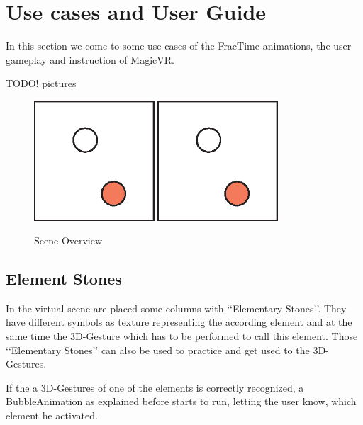 \section{Use cases and User Guide}
In this section we come to some use cases of the FracTime animations, the user gameplay and instruction of MagicVR.

TODO! pictures\\
\begin{figure}[!ht]
\includegraphics[width=0.4\textwidth]{pictures/sample.eps}
\includegraphics[width=0.4\textwidth]{pictures/sample.eps}
\caption{Scene Overview}
\end{figure}

\subsection{Element Stones}
In the virtual scene are placed some columns with \lq\lq{}Elementary Stones\rq\rq{}. They have different symbols as texture representing the according element and at the same time the 3D-Gesture which has to be performed to call this element. Those \lq\lq{}Elementary Stones\rq\rq{} can also be used to practice and get used to the 3D-Gestures.

If the a 3D-Gestures of one of the elements is correctly recognized, a BubbleAnimation as explained before starts to run, letting the user know, which element he activated.


